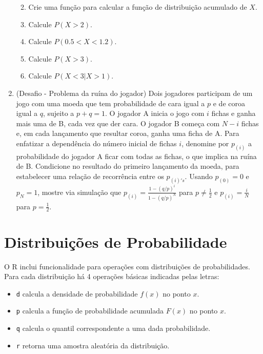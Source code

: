 \documentclass[10pt,a4paper]{book}
\providecommand{\tightlist}{%
  \setlength{\itemsep}{0pt}\setlength{\parskip}{0pt}}
\begin{document}
\begin{enumerate}
  \begin{enumerate}
  \def\labelenumii{\alph{enumii}.}
  \tightlist
  \item
    Crie uma função para calcular a função de distribuição acumulado de
    \(X\).
  \item
    Calcule \(P(X > 2)\).
  \item
    Calcule \(P(0.5 < X < 1.2)\).
  \item
    Calcule \(P(X > 3)\).
  \item
    Calcule \(P(X < 3| X > 1)\).
  \end{enumerate}
\item
  (Desafio - Problema da ruína do jogador) Dois jogadores participam de
  um jogo com uma moeda que tem probabilidade de cara igual a \(p\) e de
  coroa igual a \(q\), sujeito a \(p+q=1\). O jogador A inicia o jogo
  com \(i\) fichas e ganha mais uma de B, cada vez que der cara. O
  jogador B começa com \(N-i\) fichas e, em cada lançamento que resultar
  coroa, ganha uma ficha de A. Para enfatizar a dependência do número
  inicial de fichas \(i\), denomine por \(p_{(i)}\) a probabilidade do
  jogador A ficar com todas as fichas, o que implica na ruína de B.
  Condicione no resultado do primeiro lançamento da moeda, para
  estabelecer uma relação de recorrência entre os \(p_{(i)'s}\). Usando
  \(p_{(0)} = 0\) e \(p_{N} = 1\), mostre via simulação que
  \(p_{(i)} = \frac{1-(q/p)^i}{1-(q/p)^N}\) para \(p \neq \frac{1}{2}\)
  e \(p_{(i)} = \frac{i}{N}\) para \(p = \frac{1}{2}\).
\end{enumerate}

\section{Distribuições de
Probabilidade}\label{distribuiuxe7uxf5es-de-probabilidade}

O R inclui funcionalidade para operações com distribuições de
probabilidades. Para cada distribuição há 4 operações básicas indicadas
pelas letras:

\begin{itemize}
\tightlist
\item
  \texttt{d} calcula a densidade de probabilidade \(f(x)\) no ponto
  \(x\).
\item
  \texttt{p} calcula a função de probabilidade acumulada \(F(x)\) no
  ponto \(x\).
\item
  \texttt{q} calcula o quantil correspondente a uma dada probabilidade.
\item
  \texttt{r} retorna uma amostra aleatória da distribuição.
\end{itemize}
\end{document}
